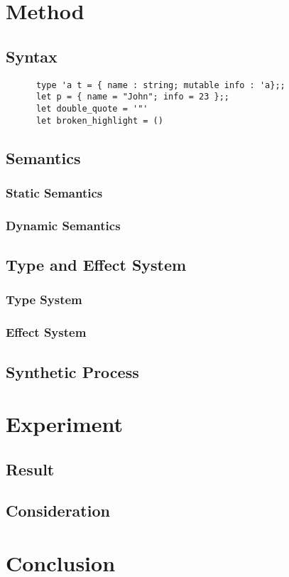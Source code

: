 \documentclass[12pt, a4paper, titlepage]{report}
\begin{document}
\chapter{Method} %
\label{section:method}
  \section{Syntax}
    \begin{verbatim}
      type 'a t = { name : string; mutable info : 'a};;
      let p = { name = "John"; info = 23 };;
      let double_quote = '"'
      let broken_highlight = ()
    \end{verbatim}
  \section{Semantics}
    \subsection{Static Semantics} %
    \subsection{Dynamic Semantics} %
  \section{Type and Effect System}
    \subsection{Type System}
    \subsection{Effect System}
  \section{Synthetic Process}

\chapter{Experiment} %
\label{section:experiment}
\section{Result}
\section{Consideration}

\chapter{Conclusion} %
\label{section:conclusion}



\end{document}
